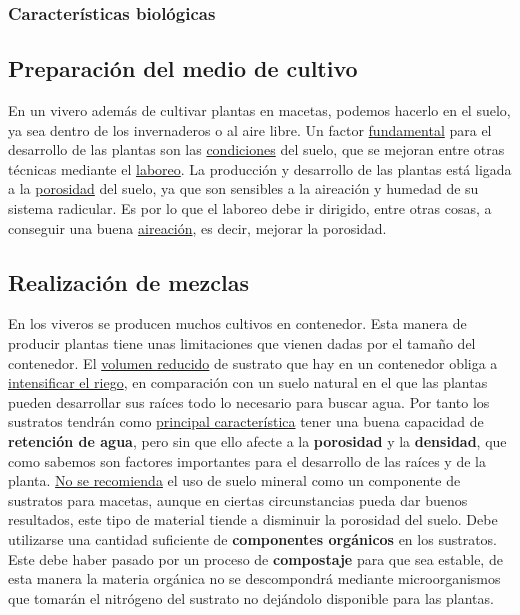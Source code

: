 \documentclass[a4paper,12pt,oneside]{article}
\begin{document}
\subsubsection{Características biológicas}
\label{sec:org79df39b}
\subsection{Preparación del medio de cultivo}
\label{sec:orgeb400f1}
En un vivero además de cultivar plantas en macetas, podemos hacerlo en el
suelo, ya sea dentro de los invernaderos o al aire libre. Un factor \uline{fundamental}
para el desarrollo de las plantas son las \uline{condiciones} del suelo, que se mejoran
entre otras técnicas mediante el \uline{laboreo}.
La producción y desarrollo de las plantas está ligada a la \uline{porosidad} del
suelo, ya que son sensibles a la aireación y humedad de su sistema radicular. Es
por lo que el laboreo debe ir dirigido, entre otras cosas, a conseguir una buena
\uline{aireación}, es decir, mejorar la porosidad.
\subsection{Realización de mezclas}
\label{sec:org8b73a64}
En los viveros se producen muchos cultivos en contenedor. Esta manera de
producir plantas tiene unas limitaciones que vienen dadas por el tamaño del
contenedor. El \uline{volumen reducido} de sustrato que hay en un contenedor obliga a
\uline{intensificar el riego}, en comparación con un suelo natural en el que las
plantas pueden desarrollar sus raíces todo lo necesario para buscar agua. Por
tanto los sustratos tendrán como \uline{principal característica} tener una buena
capacidad de \textbf{retención de agua}, pero sin que ello afecte a la \textbf{porosidad} y la
\textbf{densidad}, que como sabemos son factores importantes para el desarrollo de las
raíces y de la planta.
\uline{No se recomienda} el uso de suelo mineral como un componente de sustratos para
macetas, aunque en ciertas circunstancias pueda dar buenos resultados, este tipo
de material tiende a disminuir la porosidad del suelo.
Debe utilizarse una cantidad suficiente de \textbf{componentes orgánicos} en los
sustratos. Este debe haber pasado por un proceso de \textbf{compostaje} para que sea
estable, de esta manera la materia orgánica no se descompondrá mediante
microorganismos que tomarán el nitrógeno del sustrato no dejándolo disponible
para las plantas.
\end{document}
